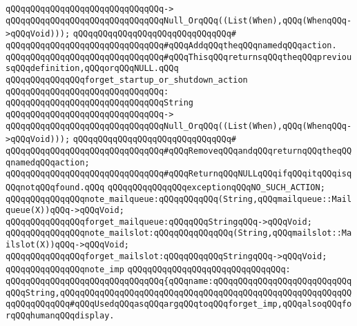 \verb|qQQqqQQqqQQqqQQqqQQqqQQqqQQqqQQq->|\newline
\verb|qQQqqQQqqQQqqQQqqQQqqQQqqQQqqQQqNull_OrqQQq((List(When),qQQq(WhenqQQq->qQQqVoid)));|\newline
\verb|qQQqqQQqqQQqqQQqqQQqqQQqqQQqqQQq#|\newline
\verb|qQQqqQQqqQQqqQQqqQQqqQQqqQQqqQQq#qQQqAddqQQqtheqQQqnamedqQQqaction.|\newline
\verb|qQQqqQQqqQQqqQQqqQQqqQQqqQQqqQQq#qQQqThisqQQqreturnsqQQqtheqQQqpreviousqQQqdefinition,qQQqorqQQqNULL.qQQq|\newline
\newline
\verb|qQQqqQQqqQQqqQQqforget_startup_or_shutdown_action|\newline
\verb|qQQqqQQqqQQqqQQqqQQqqQQqqQQqqQQq:|\newline
\verb|qQQqqQQqqQQqqQQqqQQqqQQqqQQqqQQqString|\newline
\verb|qQQqqQQqqQQqqQQqqQQqqQQqqQQqqQQq->|\newline
\verb|qQQqqQQqqQQqqQQqqQQqqQQqqQQqqQQqNull_OrqQQq((List(When),qQQq(WhenqQQq->qQQqVoid)));|\newline
\verb|qQQqqQQqqQQqqQQqqQQqqQQqqQQqqQQq#|\newline
\verb|qQQqqQQqqQQqqQQqqQQqqQQqqQQqqQQq#qQQqRemoveqQQqandqQQqreturnqQQqtheqQQqnamedqQQqaction;|\newline
\verb|qQQqqQQqqQQqqQQqqQQqqQQqqQQqqQQq#qQQqReturnqQQqNULLqQQqifqQQqitqQQqisqQQqnotqQQqfound.qQQq|\newline
\newline
\verb|qQQqqQQqqQQqqQQqexceptionqQQqNO_SUCH_ACTION;|\newline
\newline
\verb|qQQqqQQqqQQqqQQqnote_mailqueue:qQQqqQQqqQQq(String,qQQqmailqueue::Mailqueue(X))qQQq->qQQqVoid;|\newline
\verb|qQQqqQQqqQQqqQQqforget_mailqueue:qQQqqQQqStringqQQq->qQQqVoid;|\newline
\newline
\verb|qQQqqQQqqQQqqQQqnote_mailslot:qQQqqQQqqQQqqQQq(String,qQQqmailslot::Mailslot(X))qQQq->qQQqVoid;|\newline
\verb|qQQqqQQqqQQqqQQqforget_mailslot:qQQqqQQqqQQqStringqQQq->qQQqVoid;|\newline
\newline
\verb|qQQqqQQqqQQqqQQqnote_imp|\newline
\verb|qQQqqQQqqQQqqQQqqQQqqQQqqQQqqQQq:|\newline
\verb|qQQqqQQqqQQqqQQqqQQqqQQqqQQqqQQq{qQQqname:qQQqqQQqqQQqqQQqqQQqqQQqqQQqqQQqString,qQQqqQQqqQQqqQQqqQQqqQQqqQQqqQQqqQQqqQQqqQQqqQQqqQQqqQQqqQQqqQQqqQQqqQQq#qQQqUsedqQQqasqQQqargqQQqtoqQQqforget_imp,qQQqalsoqQQqforqQQqhumanqQQqdisplay.|\newline
